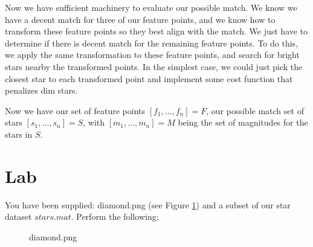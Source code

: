 \documentclass[paper=a4, fontsize=11pt]{scrartcl} %
\begin{document}
Now we have sufficient machinery to evaluate our possible match.  We know we have a decent match for three of our feature points, and we know how to transform these feature points so they best align with the match. We just have to determine if there is decent match for the remaining feature points. To do this, we apply the same transformation to these feature points, and search for bright stars nearby the transformed points. In the simplest case, we could just pick the closest star to each transformed point and implement some cost function that penalizes dim stars.

Now we have our set of feature points $[f_1,\ldots,f_n]=F$, our possible match set of stars $[s_1,\ldots,s_n] = S$, with $[m_1,\ldots,m_n] = M$ being the set of magnitudes for the stars in $S$.




\section{Lab}
You have been supplied: diamond.png (see Figure \ref{diamond}) and a subset of our star dataset $stars.mat$. Perform the following: 

\begin{figure}[!h]
\caption{diamond.png}
\label{diamond}
\end{figure}
\end{document}
